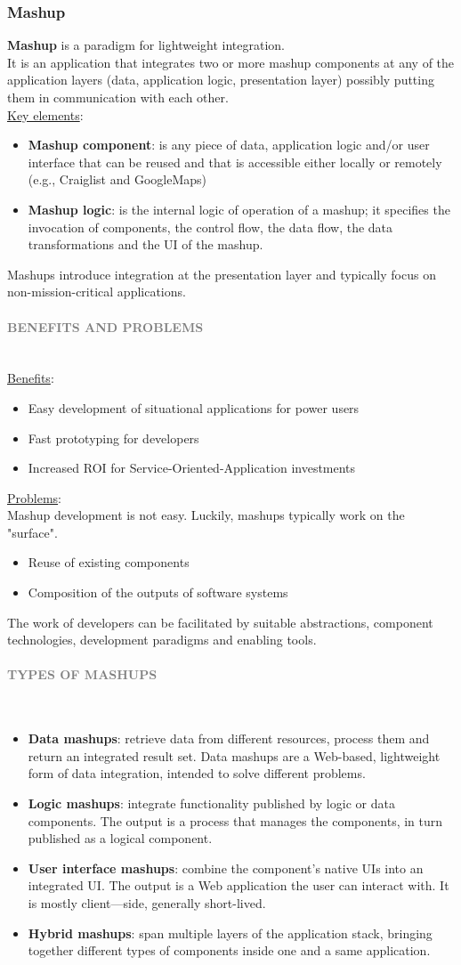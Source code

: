 \documentclass[10pt,a4paper]{article}
\newcommand{\myparagraph}[1]{\paragraph{\normalsize{\textcolor{gray}{\uppercase{\textbf{#1}}}} }\mbox{} \vspace{0.5em}\\}
\begin{document}
\subsubsection{Mashup}
\textbf{Mashup} is a paradigm for lightweight integration. \\
It is an application that integrates two or more mashup components at any of the application layers (data, application logic, presentation layer) possibly putting them in communication with each other. \\
\uline{Key elements}:
\begin{itemize}
	\item \textbf{Mashup component}: is any piece of data, application logic and/or user interface that can be reused and that is accessible either locally or remotely (e.g., Craiglist and GoogleMaps)
	\item \textbf{Mashup logic}: is the internal logic of operation of a mashup; it specifies the invocation of components, the control flow, the data flow, the data transformations and the UI of the mashup.
\end{itemize}
Mashups introduce integration at the presentation layer and typically focus on non-mission-critical applications. 
\myparagraph{Benefits and Problems}
\uline{Benefits}:
\begin{itemize}
	\item Easy development of situational applications for power users
	\item Fast prototyping for developers
	\item Increased ROI for Service-Oriented-Application investments
\end{itemize}
\uline{Problems}: \\
Mashup development is not easy. Luckily, mashups typically work on the "surface".
\begin{itemize}
	\item Reuse of existing components
	\item Composition of the outputs of software systems
\end{itemize}
The work of developers can be facilitated by suitable abstractions, component technologies, development paradigms and enabling tools. 
\myparagraph{Types of Mashups}
\begin{itemize}
	\item \textbf{Data mashups}: retrieve data from different resources, process them and return an integrated result set. Data mashups are a Web-based, lightweight form of data integration, intended to solve different problems.
	\item \textbf{Logic mashups}: integrate functionality published by logic or data components. The output is a process that manages the components, in turn published as a logical component.
	\item \textbf{User interface mashups}: combine the component’s native UIs into an integrated UI. The output is a Web application the user can interact with. It is mostly client—side, generally short-lived.
	\item \textbf{Hybrid mashups}: span multiple layers of the application stack, bringing together different types of components inside one and a same application.
\end{itemize}
\end{document}
